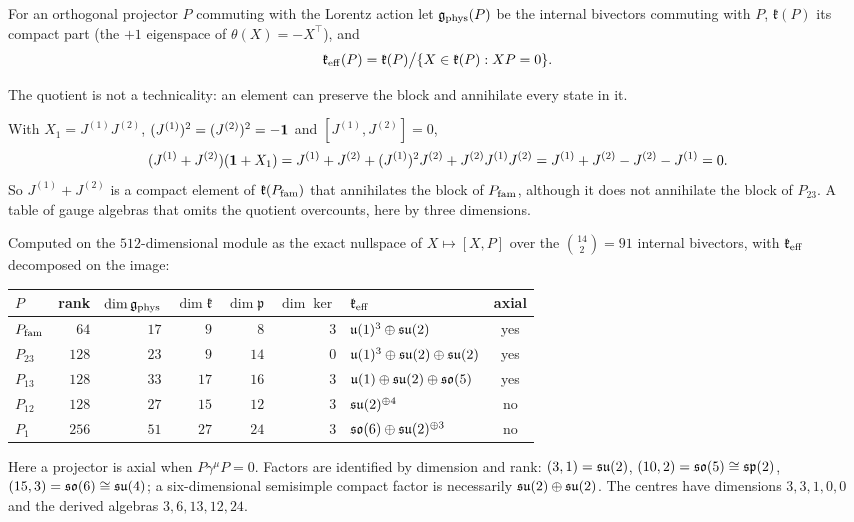 \begin{definition}
\label{def:keff}
For an orthogonal projector $P$ commuting with the Lorentz action let $\mathfrak g_{\rm phys}(P)$ be the internal bivectors commuting
with $P$, $\mathfrak k(P)$ its compact part (the $+1$ eigenspace of $\theta(X)=-X^{\!\top}$), and
\[
\mathfrak k_{\rm eff}(P)=\mathfrak k(P)\big/\{X\in\mathfrak k(P):XP=0\}.
\]
\end{definition}

The quotient is not a technicality: an element can preserve the block and annihilate every state in it.

\begin{example}[An annihilator]
\label{ex:annihilator}
With $X_1=J^{(1)}J^{(2)}$, $(J^{(1)})^2=(J^{(2)})^2=-\mathbf 1$ and $[J^{(1)},J^{(2)}]=0$,
\[
(J^{(1)}+J^{(2)})(\mathbf 1+X_1)=J^{(1)}+J^{(2)}+(J^{(1)})^2J^{(2)}+J^{(2)}J^{(1)}J^{(2)}=J^{(1)}+J^{(2)}-J^{(2)}-J^{(1)}=0 .
\]
So $J^{(1)}+J^{(2)}$ is a compact element of $\mathfrak k(P_{\rm fam})$ that annihilates the block of $P_{\rm fam}$, although it does not annihilate the
block of $P_{23}$. A table of gauge algebras that omits the quotient overcounts, here by three dimensions.
\end{example}

\begin{theorem}
\label{thm:table}
Computed on the $512$-dimensional module as the exact nullspace of $X\mapsto[X,P]$ over the $\binom{14}2=91$ internal bivectors, with
$\mathfrak k_{\rm eff}$ decomposed on the image:
\begin{center}
\begin{tabular}{@{}lrrrrrlc@{}}
\toprule
$P$ & rank & $\dim\mathfrak g_{\rm phys}$ & $\dim\mathfrak k$ & $\dim\mathfrak p$ & $\dim\ker$ & $\mathfrak k_{\rm eff}$ & axial\\
\midrule
$P_{\rm fam}$ & $64$ & $17$ & $9$ & $8$ & $3$ & $\mathfrak{u}(1)^3\oplus\mathfrak{su}(2)$ & yes\\
$P_{23}$ & $128$ & $23$ & $9$ & $14$ & $0$ & $\mathfrak{u}(1)^3\oplus\mathfrak{su}(2)\oplus\mathfrak{su}(2)$ & yes\\
$P_{13}$ & $128$ & $33$ & $17$ & $16$ & $3$ & $\mathfrak{u}(1)\oplus\mathfrak{su}(2)\oplus\mathfrak{so}(5)$ & yes\\
$P_{12}$ & $128$ & $27$ & $15$ & $12$ & $3$ & $\mathfrak{su}(2)^{\oplus4}$ & no\\
$P_1$ & $256$ & $51$ & $27$ & $24$ & $3$ & $\mathfrak{so}(6)\oplus\mathfrak{su}(2)^{\oplus3}$ & no\\
\bottomrule
\end{tabular}
\end{center}
Here a projector is axial when $P\gamma^\mu P=0$. Factors are identified by dimension and rank: $(3,1)=\mathfrak{su}(2)$, $(10,2)=\mathfrak{so}(5)\cong\mathfrak{sp}(2)$,
$(15,3)=\mathfrak{so}(6)\cong\mathfrak{su}(4)$; a six-dimensional semisimple compact factor is necessarily $\mathfrak{su}(2)\oplus\mathfrak{su}(2)$. The centres have dimensions
$3,3,1,0,0$ and the derived algebras $3,6,13,12,24$.
\end{theorem}


